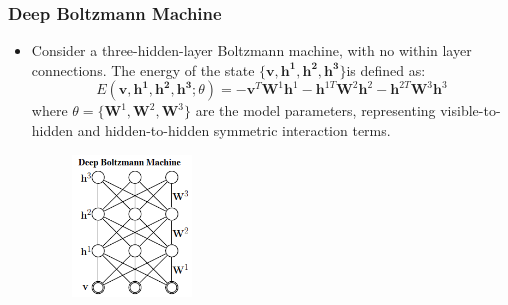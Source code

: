 \documentclass{beamer}
\begin{document}
\begin{frame}
\frametitle{Deep Boltzmann Machine}
\begin{itemize}
\item Consider a three-hidden-layer Boltzmann machine, with no within layer connections. The energy of the state $\{\mathbf{v, h^1, h^2, h^3} \}$is defined as:
\begin{equation}
E(\mathbf{v, h^1, h^2, h^3}; \theta)=-\mathbf{v}^T\mathbf{W}^1\mathbf{h}^1-\mathbf{h}^{1T}\mathbf{W}^2\mathbf{h}^2-\mathbf{h}^{2T}\mathbf{W}^3\mathbf{h}^3
\end{equation}
where $\theta=\{\mathbf{W}^1, \mathbf{W}^2, \mathbf{W}^3\}$ are the model parameters, representing visible-to-hidden and hidden-to-hidden symmetric interaction terms.
\begin{figure}
\centering
  \includegraphics[width=0.3\textwidth]{figs/dbms.png}
\end{figure}
\end{itemize}
\end{frame}

\end{document}

